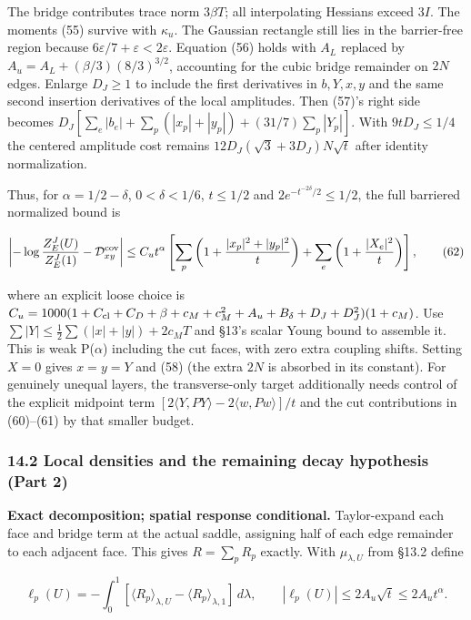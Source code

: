 \documentclass[11pt,a4paper]{article}
\begin{document}
The bridge contributes trace norm \(3\beta T\); all interpolating
Hessians exceed \(3I\). The moments (55) survive with \(\kappa_u\). The
Gaussian rectangle still lies in the barrier-free region because
\(6\varepsilon/7+\varepsilon<2\varepsilon\). Equation (56) holds with
\(A_L\) replaced by \(A_u=A_L+(\beta/3)(8/3)^{3/2}\), accounting for the
cubic bridge remainder on \(2N\) edges. Enlarge \(D_J\ge1\) to include
the first derivatives in \(b,Y,x,y\) and the same second insertion
derivatives of the local amplitudes. Then (57)'s right side becomes
\(D_J[\sum_e|b_e|+\sum_p(|x_p|+|y_p|)+(31/7)\sum_p|Y_p|]\). With
\(9tD_J\le1/4\) the centered amplitude cost remains
\(12D_J(\sqrt3+3D_J)N\sqrt t\) after identity normalization.

Thus, for \(\alpha=1/2-\delta\), \(0<\delta<1/6\), \(t\le1/2\) and
\(2e^{-t^{-2\delta}/2}\le1/2\), the full barriered normalized bound is

\[\left|-\log\frac{Z_E^J(U)}{Z_E^J(1)}-\mathcal D_{xy}^{\rm cov}\right|
\le C_u t^\alpha\left[\sum_p\left(1+\frac{|x_p|^2+|y_p|^2}{t}\right)
+\sum_e\left(1+\frac{|X_e|^2}{t}\right)\right],\tag{62}\]

where an explicit loose choice is
\(C_u=1000(1+C_{\rm cl}+C_D+\beta+c_M+c_M^2+A_u+B_\delta+D_J+D_J^2)(1+c_M)\).
Use \(\sum|Y|\le\frac12\sum(|x|+|y|)+2c_MT\) and §13's scalar Young
bound to assemble it. This is weak P(\(\alpha\)) including the cut
faces, with zero extra coupling shifts. Setting \(X=0\) gives \(x=y=Y\)
and (58) (the extra \(2N\) is absorbed in its constant). For genuinely
unequal layers, the transverse-only target additionally needs control of
the explicit midpoint term
\([2\langle Y,PY\rangle-2\langle w,Pw\rangle]/t\) and the cut
contributions in (60)--(61) by that smaller budget.

\hypertarget{local-densities-and-the-remaining-decay-hypothesis-part-2}{%
\subsubsection{14.2 Local densities and the remaining decay hypothesis
(Part
2)}\label{local-densities-and-the-remaining-decay-hypothesis-part-2}}

\textbf{Exact decomposition; spatial response conditional.}
Taylor-expand each face and bridge term at the actual saddle, assigning
half of each edge remainder to each adjacent face. This gives
\(R=\sum_pR_p\) exactly. With \(\mu_{\lambda,U}\) from §13.2 define

\[\ell_p(U)=-\int_0^1[\langle R_p\rangle_{\lambda,U}
-\langle R_p\rangle_{\lambda,1}]\,d\lambda,\qquad
|\ell_p(U)|\le2A_u\sqrt t\le2A_ut^\alpha.\tag{63}\]
\end{document}
